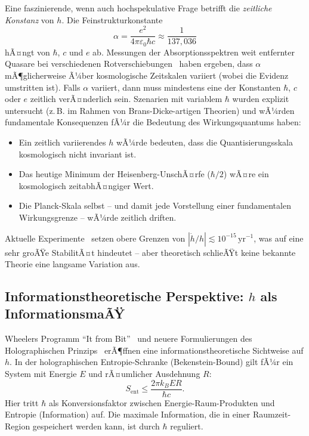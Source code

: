 ﻿\documentclass[12pt,a4paper]{article}
\theoremstyle{plain}
\theoremstyle{definition}
\theoremstyle{remark}
\begin{document}
Eine faszinierende, wenn auch hochspekulative Frage betrifft die \emph{zeitliche
Konstanz} von $h$. Die Feinstrukturkonstante
\begin{equation}
  \alpha = \frac{e^2}{4\pi\varepsilon_0 \hbar c} \approx \frac{1}{137{,}036}
\end{equation}
hÃ¤ngt von $\hbar$, $c$ und $e$ ab. Messungen der Absorptionsspektren weit entfernter
Quasare bei verschiedenen Rotverschiebungen~\cite{webb2001,king2012} haben ergeben, dass
$\alpha$ mÃ¶glicherweise Ã¼ber kosmologische Zeitskalen variiert (wobei die Evidenz umstritten ist).
Falls $\alpha$ variiert, dann muss mindestens eine der Konstanten $\hbar$, $c$ oder $e$ zeitlich
verÃ¤nderlich sein. Szenarien mit variablem $\hbar$ wurden explizit untersucht
(z.\,B. im Rahmen von Brans-Dicke-artigen Theorien) und wÃ¼rden fundamentale Konsequenzen
fÃ¼r die Bedeutung des Wirkungsquantums haben:

\begin{itemize}[leftmargin=2em]
  \item Ein zeitlich variierendes $h$ wÃ¼rde bedeuten, dass die Quantisierungsskala
        kosmologisch nicht invariant ist.
  \item Das heutige Minimum der Heisenberg-UnschÃ¤rfe ($\hbar/2$) wÃ¤re ein
        kosmologisch zeitabhÃ¤ngiger Wert.
  \item Die Planck-Skala selbst -- und damit jede Vorstellung einer fundamentalen
        Wirkungsgrenze -- wÃ¼rde zeitlich driften.
\end{itemize}

Aktuelle Experimente~\cite{uzan2011} setzen obere Grenzen von
$|\dot{h}/h| \lesssim 10^{-15}\,\text{yr}^{-1}$, was auf eine sehr groÃŸe
StabilitÃ¤t hindeutet -- aber theoretisch schlieÃŸt keine bekannte Theorie eine
langsame Variation aus.

\subsection{Informationstheoretische Perspektive: $h$ als InformationsmaÃŸ}

Wheelers Programm ``It from Bit''~\cite{wheeler1990} und neuere Formulierungen des
Holographischen Prinzips~\cite{bousso2002} erÃ¶ffnen eine informationstheoretische
Sichtweise auf $h$. In der holographischen Entropie-Schranke (Bekenstein-Bound) gilt
fÃ¼r ein System mit Energie $E$ und rÃ¤umlicher Ausdehnung $R$:
\begin{equation}
  S_{\mathrm{ent}} \leq \frac{2\pi k_B E R}{\hbar c}.
\end{equation}
Hier tritt $\hbar$ als Konversionsfaktor zwischen Energie-Raum-Produkten und
Entropie (Information) auf. Die maximale Information, die in einer Raumzeit-Region
gespeichert werden kann, ist durch $\hbar$ reguliert.
\end{document}

